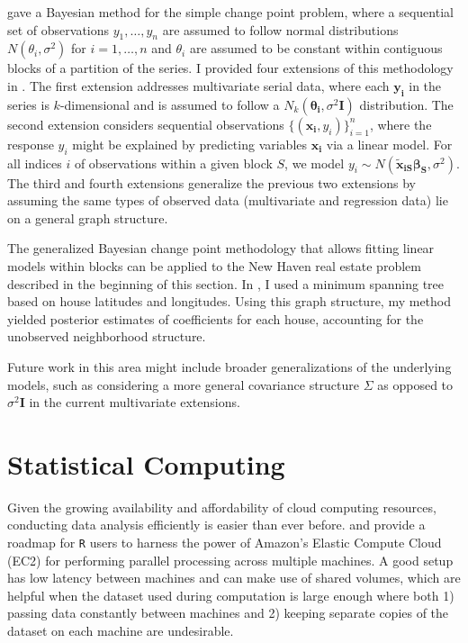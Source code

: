\documentclass[11pt]{article}
\begin{document}
 \cite{barry93} gave a Bayesian method for the simple change point problem, where a sequential set of observations $y_1,\dots,y_n$ are assumed to follow normal distributions $N(\theta_i,\sigma^2)$ for $i=1,\dots,n$ and $\theta_i$ are assumed to be constant within contiguous blocks of a partition of the series. I provided four extensions of this methodology in \cite{bcp}. The first extension addresses multivariate serial data, where each $\bm{y_i}$ in the series is $k$-dimensional and is assumed to follow a $N_k(\bm{\theta_i},\sigma^2\bm{I})$ distribution. The second extension considers sequential observations $\{(\bm{x_i},y_i)\}_{i=1}^n$, where the response $y_i$ might be explained by predicting variables $\bm{x_i}$ via a linear model. For all indices $i$ of observations within a given block $S$, we model $y_i\sim N(\bm{\widetilde{x}_{iS}}\bm{\beta_S}, \sigma^2)$. The third and fourth extensions generalize the previous two extensions by assuming the same types of observed data (multivariate and regression data) lie on a general graph structure. 

 The generalized Bayesian change point methodology that allows fitting linear models within blocks can be applied to the New Haven real estate problem described in the beginning of this section. In \cite{bcp}, I used a minimum spanning tree based on house latitudes and longitudes. Using this graph structure, my method yielded posterior estimates of coefficients for each house, accounting for the unobserved neighborhood structure.

 Future work in this area might include broader generalizations of the underlying models, such as considering a more general covariance structure $\Sigma$ as opposed to $\sigma^2\bm{I}$ in the current multivariate extensions. 

 \section{Statistical Computing} %
 \label{sec:statistical_computing}
  Given the growing availability and affordability of cloud computing resources, conducting data analysis efficiently is easier than ever before.  \cite{ec2} and \cite{ec2-b} provide a roadmap for \verb|R| users to harness the power of Amazon's Elastic Compute Cloud (EC2) for performing parallel processing across multiple machines. A good setup has low latency between machines and can make use of shared volumes, which are helpful when the dataset used during computation is large enough where both 1) passing data constantly between machines and 2) keeping separate copies of the dataset on each machine are undesirable.
\end{document}
